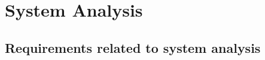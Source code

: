 \chapter{System Analysis}
\label{ch:systemanalysis}



\section{Requirements related to system analysis} 
\label{SA:requirements}



